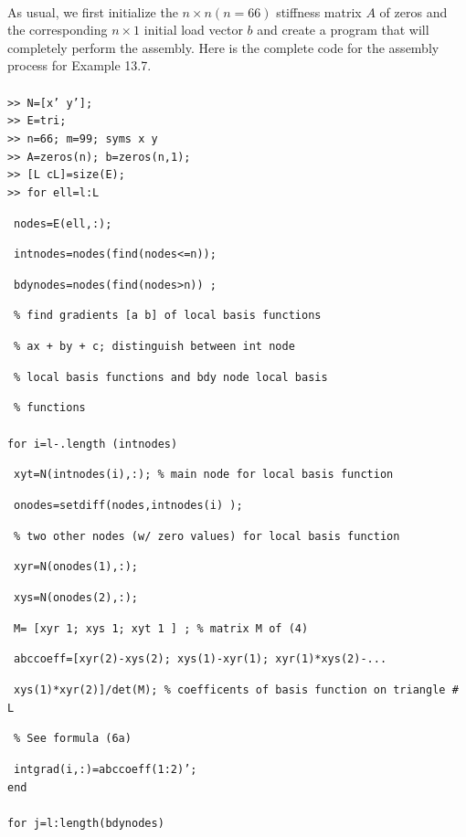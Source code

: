 \documentclass[../main.tex]{subfiles}
\begin{document}
\\
As usual, we first initialize the $n \times n(n=66)$ stiffness matrix $A$ of zeros and the corresponding $n \times 1$ initial load vector $b$ and create a program that will completely perform the assembly. Here is the complete code for the assembly process for Example 13.7.
\\
\\
\texttt{>> N=[x' y'];}\\
\texttt{>> E=tri;}\\
\texttt{>> n=66; m=99; syms x y}\\
\texttt{>> A=zeros(n); b=zeros(n,1);}\\
\texttt{>> [L cL]=size(E);}\\
\texttt{>> for ell=l:L}

~\texttt{nodes=E(ell,:); }

~\texttt{intnodes=nodes(find(nodes<=n)); }

~\texttt{bdynodes=nodes(find(nodes>n)) ;}

~\texttt{\% find gradients [a b] of local basis functions}

~\texttt{\% ax + by + c; distinguish between int node}

~\texttt{\% local basis functions and bdy node local basis}

~\texttt{\% functions}\\
\\
\texttt{for i=l-.length (intnodes)}

~\texttt{xyt=N(intnodes(i),:); \% main node for local basis function}

~\texttt{onodes=setdiff(nodes,intnodes(i) );}

~\texttt{\% two other nodes (w/ zero values) for local basis function}

~\texttt{xyr=N(onodes(1),:); 
}

~\texttt{xys=N(onodes(2),:);}

~\texttt{M= [xyr 1; xys 1; xyt 1 ] ; \% matrix M of (4) }

~\texttt{abccoeff=[xyr(2)-xys(2); xys(1)-xyr(1); xyr(1)*xys(2)-... 
}

~\texttt{xys(1)*xyr(2)]/det(M); \% coefficents of basis function on triangle \# L }

~\texttt{\% See formula (6a)}

~\texttt{intgrad(i,:)=abccoeff(1:2)';}
\\
\texttt{end}
\\
\\
\texttt{for j=l:length(bdynodes)}
\end{document}

